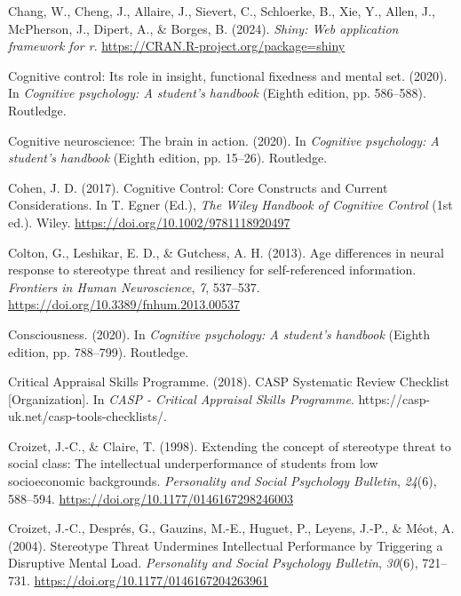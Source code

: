 \documentclass[
  stu, a4paper, 12pt,mask,floatsintext]{apa7}
\newlength{\cslhangindent}
\newenvironment{CSLReferences}[2] %
 {\begin{list}{}{%
  \setlength{\itemindent}{0pt}
  \setlength{\leftmargin}{0pt}
  \setlength{\parsep}{0pt}
  \ifodd #1
   \setlength{\leftmargin}{\cslhangindent}
   \setlength{\itemindent}{-1\cslhangindent}
  \fi
  \setlength{\itemsep}{#2\baselineskip}}}
 {\end{list}}
\begin{document}
\begin{CSLReferences}{1}{0}
Chang, W., Cheng, J., Allaire, J., Sievert, C., Schloerke, B., Xie, Y., Allen, J., McPherson, J., Dipert, A., \& Borges, B. (2024). \emph{Shiny: Web application framework for r}. \url{https://CRAN.R-project.org/package=shiny}

Cognitive control: Its role in insight, functional fixedness and mental set. (2020). In \emph{Cognitive psychology: A student's handbook} (Eighth edition, pp. 586--588). Routledge.

Cognitive neuroscience: The brain in action. (2020). In \emph{Cognitive psychology: A student's handbook} (Eighth edition, pp. 15--26). Routledge.

Cohen, J. D. (2017). Cognitive {Control}: {Core Constructs} and {Current Considerations}. In T. Egner (Ed.), \emph{The {Wiley Handbook} of {Cognitive Control}} (1st ed.). Wiley. \url{https://doi.org/10.1002/9781118920497}

Colton, G., Leshikar, E. D., \& Gutchess, A. H. (2013). Age differences in neural response to stereotype threat and resiliency for self-referenced information. \emph{Frontiers in Human Neuroscience}, \emph{7}, 537--537. \url{https://doi.org/10.3389/fnhum.2013.00537}

Consciousness. (2020). In \emph{Cognitive psychology: A student's handbook} (Eighth edition, pp. 788--799). Routledge.

Critical Appraisal Skills Programme. (2018). {CASP Systematic Review Checklist} {[}Organization{]}. In \emph{CASP - Critical Appraisal Skills Programme}. https://casp-uk.net/casp-tools-checklists/.

Croizet, J.-C., \& Claire, T. (1998). Extending the concept of stereotype threat to social class: {The} intellectual underperformance of students from low socioeconomic backgrounds. \emph{Personality and Social Psychology Bulletin}, \emph{24}(6), 588--594. \url{https://doi.org/10.1177/0146167298246003}

Croizet, J.-C., Després, G., Gauzins, M.-E., Huguet, P., Leyens, J.-P., \& Méot, A. (2004). Stereotype {Threat Undermines Intellectual Performance} by {Triggering} a {Disruptive Mental Load}. \emph{Personality and Social Psychology Bulletin}, \emph{30}(6), 721--731. \url{https://doi.org/10.1177/0146167204263961}


\end{CSLReferences}
\end{document}
